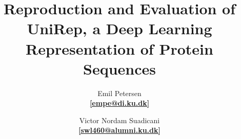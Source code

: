 \title{
    \vspace{6cm}
    \Huge{\textbf{Reproduction and Evaluation of UniRep, a Deep Learning Representation of Protein Sequences}} \\
}

\author{\Large{Emil Petersen} \\ \href{mailto:empe@di.ku.dk}{\textbf{[empe@di.ku.dk]}} \and \Large{Victor Nordam Suadicani} \\ \href{mailto:nordam@di.ku.dk}{\textbf{[swl460@alumni.ku.dk]}}
}




\maketitle

\thispagestyle{empty}

\newpage
\setcounter{page}{1}
